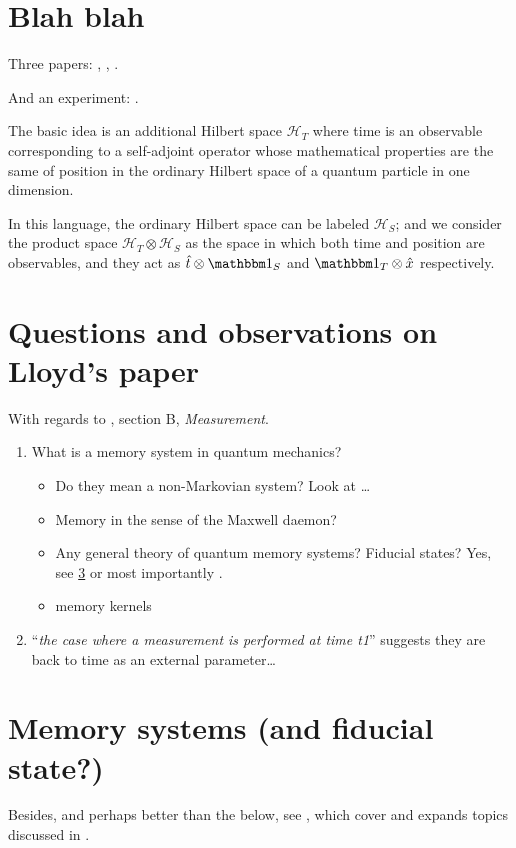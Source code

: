 \section{Blah blah}

Three papers: \cite{Lloyd:Time}, \cite{Marletto:Evolution}, \cite{Prvanovic}.

And an experiment: \cite{Moreva:synthetic,Moreva:illustration}.

The basic idea is an additional Hilbert space $\mathcal{H}_T$ where time is an observable
corresponding to
a self-adjoint operator whose mathematical properties are the same of position in the
ordinary Hilbert space of a quantum particle in one dimension.

In this language, the ordinary Hilbert space can be labeled $\mathcal{H}_S$;
and we consider the product space $\mathcal{H}_T \otimes \mathcal{H}_S$ as
the space in which both time and position are observables, and they act as
$\hat{t} \otimes \idop_S$ and $\idop_T \otimes \hat{x}$
respectively.

\section{Questions and observations on Lloyd's paper}

With regards to \cite{Lloyd:Time}, section B, \textit{Measurement}.

\begin{enumerate}
  \item What is a memory system in quantum mechanics? 
  \begin{itemize}
    \item Do they mean a non-Markovian system? Look at \cite{MeasurementMarkovian}\dots
    \item Memory in the sense of the Maxwell daemon?
    \item
      Any general theory of quantum memory systems? Fiducial states?
      Yes, see \ref{sec:qmemory} or most importantly \cite[Ch.~3]{PreskillMeasurement}.
    \item memory kernels \cite{CarmichaelOQS2017}
  \end{itemize}
  \item ``\emph{the case where a measurement is performed at time t1}'' suggests they are back to time as an external parameter\dots
\end{enumerate}

\section{Memory systems (and fiducial state?)}\label{sec:qmemory}
Besides, and perhaps better than the below, see \cite[Ch.~3]{PreskillMeasurement},
which cover and expands topics discussed in \cite{open_systems}.


